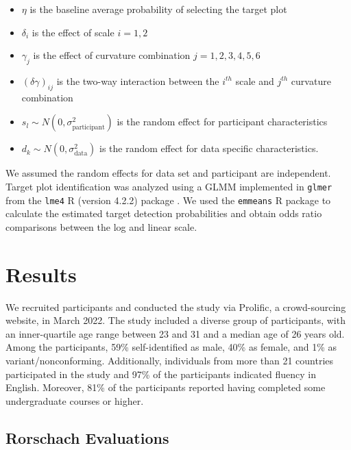 \documentclass[12pt]{article}
\begin{document}
\begin{itemize}
\item $\eta$ is the baseline average probability of selecting the target plot
\item $\delta_i$ is the effect of scale $i = 1,2$
\item $\gamma_j$ is the effect of curvature combination $j = 1,2,3,4,5,6$
\item $(\delta\gamma)_{ij}$ is the two-way interaction between the $i^{th}$ scale and $j^{th}$ curvature combination
\item $s_l \sim N(0,\sigma^2_\text{participant})$ is the random effect for participant characteristics
\item $d_k \sim N(0,\sigma^2_{\text{data}})$ is the random effect for data specific characteristics. 
\end{itemize}

\noindent We assumed the random effects for data set and participant are
independent. Target plot identification was analyzed using a GLMM
implemented in \texttt{glmer} from the \texttt{lme4} R (version 4.2.2)
package \citep{lme4}. We used the \texttt{emmeans} R package
\citep{emmeans} to calculate the estimated target detection
probabilities and obtain odds ratio comparisons between the log and
linear scale.

\section{Results}\label{results}

We recruited participants and conducted the study via Prolific, a
crowd-sourcing website, in March 2022. The study included a diverse
group of participants, with an inner-quartile age range between 23 and
31 and a median age of 26 years old. Among the participants, 59\%
self-identified as male, 40\% as female, and 1\% as
variant/nonconforming. Additionally, individuals from more than 21
countries participated in the study and 97\% of the participants
indicated fluency in English. Moreover, 81\% of the participants
reported having completed some undergraduate courses or higher.

\subsection{Rorschach Evaluations}\label{rorschach-evaluations}
\end{document}
